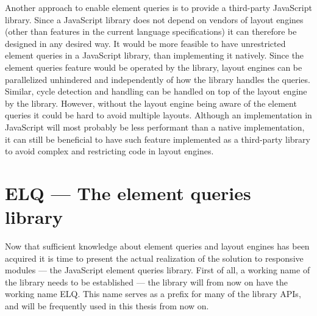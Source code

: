 \documentclass[a4paper,11pt]{kth-mag}
\begin{document}
      Another approach to enable element queries is to provide a \gls{third-party} \gls{JavaScript} library.
      Since a \gls{JavaScript} library does not depend on vendors of \glspl{layout engine} (other than features in the current language specifications) it can therefore be designed in any desired way.
      It would be more feasible to have unrestricted element queries in a \gls{JavaScript} library, than implementing it natively.
      Since the element queries feature would be operated by the library, \glspl{layout engine} can be parallelized unhindered and independently of how the library handles the queries.
      Similar, cycle detection and handling can be handled on top of the \gls{layout engine} by the library.
      However, without the \gls{layout engine} being aware of the element queries it could be hard to avoid multiple layouts.
      Although an implementation in \gls{JavaScript} will most probably be less performant than a \gls{native} implementation, it can still be beneficial to have such feature implemented as a \gls{third-party} library to avoid complex and restricting code in \glspl{layout engine}.

  \chapter{ELQ --- The element queries library}\label{chp:library}
    Now that sufficient knowledge about element queries and layout engines has been acquired it is time to present the actual realization of the solution to responsive modules --- the JavaScript element queries library.
    First of all, a working name of the library needs to be established --- the library will from now on have the working name \gls{ELQ}.
    This name serves as a prefix for many of the library \glspl{API}, and will be frequently used in this thesis from now on.
    
\end{document}
